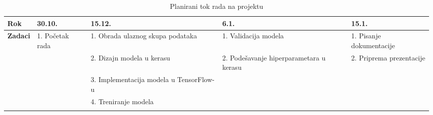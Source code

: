 \documentclass{report}
\begin{document}
\begin{longtable}{|p{35pt}|p{90pt}|p{90pt}|p{90pt}|p{90pt}|}
\hline
\textbf{Rok} & \textbf{30.10.} & \textbf{15.12.} & \textbf{6.1.} & \textbf{15.1.} \\
\hline
\multirow{5}{*}{\textbf{Zadaci}} 
                   & 1. Početak rada & 1. Obrada ulaznog skupa podataka & 1. Validacija modela & 1. Pisanje dokumentacije \\
                   & & 2. Dizajn modela u kerasu & 2. Podešavanje hiperparametara u kerasu & 2. Priprema prezentacije \\
                   & & 3. Implementacija modela u TensorFlow-u & & \\
                   & & 4. Treniranje modela & & \\
\hline

\caption{Planirani tok rada na projektu}
\end{longtable}
\end{document}
